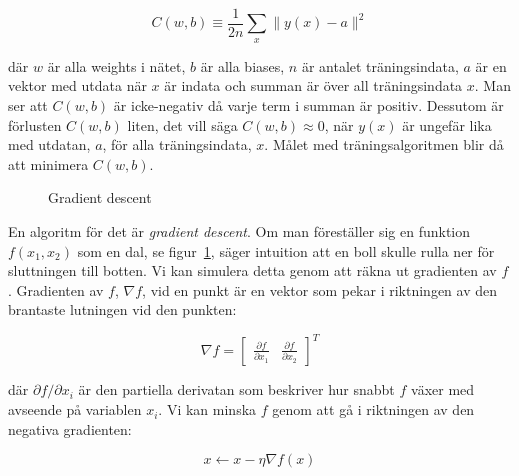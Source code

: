 \begin{equation}
	C(w, b) \equiv \frac{1}{2n} \displaystyle\sum_x \lVert y(x) - a \rVert^2
\end{equation}

där $ w $ är alla weights i nätet, $ b $ är alla biases,
$ n $ är antalet träningsindata, $ a $ är en vektor med utdata när $ x $ är indata
och summan är över all träningsindata $ x $.
Man ser att $ C(w, b) $ är icke-negativ då varje term i summan är positiv.
Dessutom är förlusten $ C(w, b) $ liten, det vill säga $ C(w, b) \approx 0 $,
när $ y(x) $ är ungefär lika med utdatan, $ a $, för alla träningsindata, $ x $.
Målet med träningsalgoritmen blir då att minimera $ C(w, b) $.

\begin{figure}
	\centering
	\caption{Gradient descent}
	\label{fig:descent}
\end{figure}

En algoritm för det är \emph{gradient descent}.
Om man föreställer sig en funktion $ f(x_1, x_2) $ som en dal,
se figur~\ref{fig:descent},
säger intuition att en boll skulle rulla ner för sluttningen till botten.
Vi kan simulera detta genom att räkna ut gradienten av $ f $.
Gradienten av $ f $, $ \nabla f $, vid en punkt är en vektor
som pekar i riktningen av den brantaste lutningen vid den punkten:

\begin{equation}
	\nabla f = \begin{bmatrix} \frac{\partial f}{\partial x_1} & \frac{\partial f}{\partial x_2} \end{bmatrix}^{T}
\end{equation}

där $ \partial f / \partial x_i $ är den partiella derivatan
som beskriver hur snabbt $ f $ växer med avseende på variablen $ x_i $.
Vi kan minska $ f $ genom att gå i riktningen av den negativa gradienten:

\begin{equation}
	x \leftarrow x - \eta \nabla f(x)
\end{equation}

